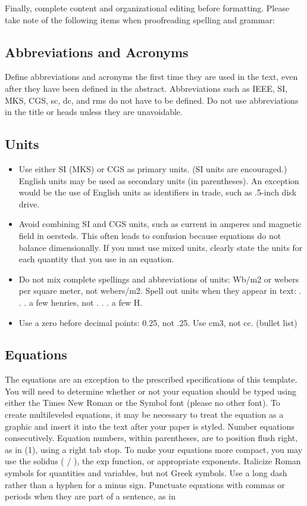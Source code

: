 \documentclass[letterpaper, 10 pt, conference]{ieeeconf}  %
\begin{document}
Finally, complete content and organizational editing before formatting. Please take note of the following items when proofreading spelling and grammar:

\subsection{Abbreviations and Acronyms} Define abbreviations and acronyms the first time they are used in the text, even after they have been defined in the abstract. Abbreviations such as IEEE, SI, MKS, CGS, sc, dc, and rms do not have to be defined. Do not use abbreviations in the title or heads unless they are unavoidable.

\subsection{Units}

\begin{itemize}

\item Use either SI (MKS) or CGS as primary units. (SI units are encouraged.) English units may be used as secondary units (in parentheses). An exception would be the use of English units as identifiers in trade, such as .5-inch disk drive.
\item Avoid combining SI and CGS units, such as current in amperes and magnetic field in oersteds. This often leads to confusion because equations do not balance dimensionally. If you must use mixed units, clearly state the units for each quantity that you use in an equation.
\item Do not mix complete spellings and abbreviations of units: Wb/m2 or webers per square meter, not webers/m2.  Spell out units when they appear in text: . . . a few henries, not . . . a few H.
\item Use a zero before decimal points: 0.25, not .25. Use cm3, not cc. (bullet list)

\end{itemize}


\subsection{Equations}

The equations are an exception to the prescribed specifications of this template. You will need to determine whether or not your equation should be typed using either the Times New Roman or the Symbol font (please no other font). To create multileveled equations, it may be necessary to treat the equation as a graphic and insert it into the text after your paper is styled. Number equations consecutively. Equation numbers, within parentheses, are to position flush right, as in (1), using a right tab stop. To make your equations more compact, you may use the solidus ( / ), the exp function, or appropriate exponents. Italicize Roman symbols for quantities and variables, but not Greek symbols. Use a long dash rather than a hyphen for a minus sign. Punctuate equations with commas or periods when they are part of a sentence, as in
\end{document}
